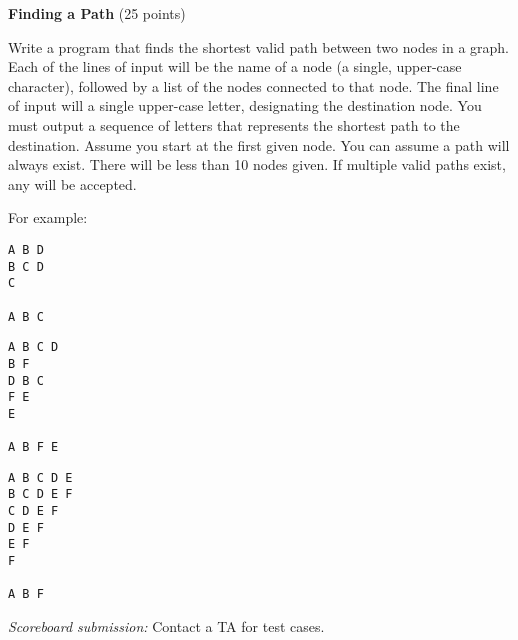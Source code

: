 \documentclass[11pt]{cselabheader}
\theoremstyle{plain}
\begin{document}
\begin{prob}[path.py]
    \textbf{Finding a Path} (25 points)

    
    Write a program that finds the shortest valid path between two nodes in a graph.
    Each of the lines of input will be the name of a node (a single, upper-case
    character), followed by a list of the nodes connected to that node. The final
    line of input will a single upper-case letter, designating the destination node.
    You must output a sequence of letters that represents the shortest path to the
    destination. Assume you start at the first given node. You can assume a path will
    always exist. There will be less than 10 nodes given. If multiple valid paths
    exist, any will be accepted.
    
    For example:\\
    \begin{minipage}{.33\linewidth}
      \begin{minipage}{.8\linewidth}
        \begin{lstlisting}[style=bash]
A B D
B C D
C

A B C
        \end{lstlisting}
      \end{minipage}
    \end{minipage}
    \begin{minipage}{.33\linewidth}
      \begin{minipage}{.8\linewidth}
        \begin{lstlisting}[style=bash]
A B C D
B F
D B C
F E
E

A B F E
        \end{lstlisting}
      \end{minipage}
    \end{minipage}
    \begin{minipage}{.33\linewidth}
      \begin{minipage}{.8\linewidth}
        \begin{lstlisting}[style=bash]
A B C D E
B C D E F
C D E F
D E F
E F
F

A B F
        \end{lstlisting}
      \end{minipage}
    \end{minipage}

    \textit{Scoreboard submission:} Contact a TA for test cases.
\end{prob}
\end{document}
